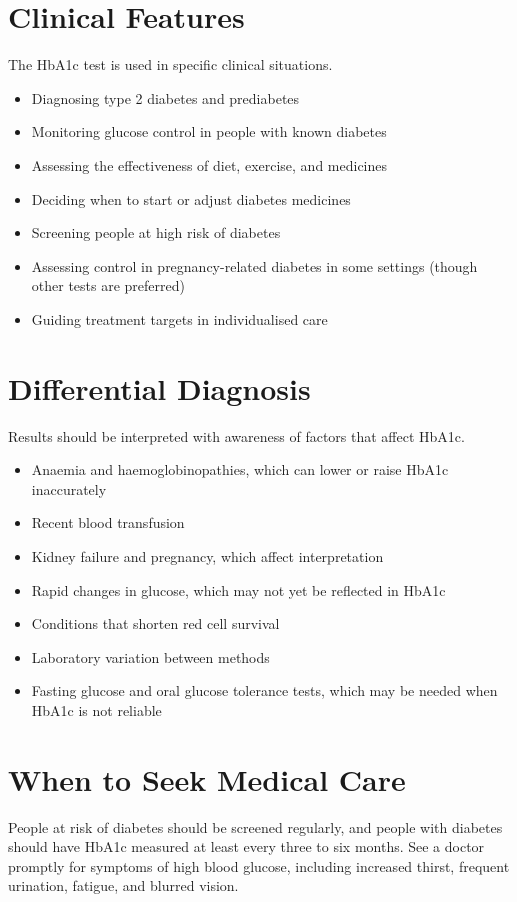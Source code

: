 \section*{Clinical Features}
The HbA1c test is used in specific clinical situations.

\begin{itemize}
    \item Diagnosing type 2 diabetes and prediabetes
    \item Monitoring glucose control in people with known diabetes
    \item Assessing the effectiveness of diet, exercise, and medicines
    \item Deciding when to start or adjust diabetes medicines
    \item Screening people at high risk of diabetes
    \item Assessing control in pregnancy-related diabetes in some settings (though other tests are preferred)
    \item Guiding treatment targets in individualised care
\end{itemize}

\section*{Differential Diagnosis}
Results should be interpreted with awareness of factors that affect HbA1c.

\begin{itemize}
    \item Anaemia and haemoglobinopathies, which can lower or raise HbA1c inaccurately
    \item Recent blood transfusion
    \item Kidney failure and pregnancy, which affect interpretation
    \item Rapid changes in glucose, which may not yet be reflected in HbA1c
    \item Conditions that shorten red cell survival
    \item Laboratory variation between methods
    \item Fasting glucose and oral glucose tolerance tests, which may be needed when HbA1c is not reliable
\end{itemize}

\section*{When to Seek Medical Care}
People at risk of diabetes should be screened regularly, and people with diabetes should have HbA1c measured at least every three to six months. See a doctor promptly for symptoms of high blood glucose, including increased thirst, frequent urination, fatigue, and blurred vision.

